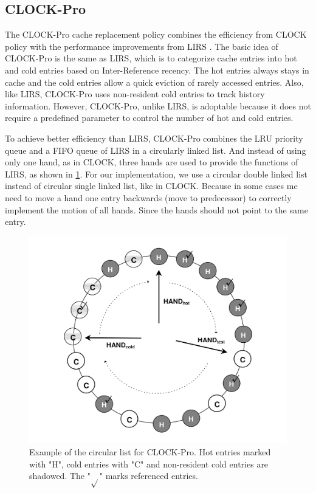 \documentclass[
	12pt,
	a4paper,
	abstract,
	bibliography=totoc,
	chapterprefix,
	headings=openright,
	numbers=endperiod,
	parskip=half,
	twoside,
]{scrreprt}
\begin{document}
\subsection{CLOCK-Pro}

The CLOCK-Pro cache replacement policy \cite{jiang2005clock} combines the efficiency from CLOCK policy with the performance improvements from LIRS 
\cite{10.1145/511399.511340}.
The basic idea of CLOCK-Pro is the same as LIRS, which is to categorize cache entries into hot and cold entries based on Inter-Reference recency.
The hot entries always stays in cache and the cold entries allow a quick eviction of rarely accessed entries.
Also, like LIRS, CLOCK-Pro uses non-resident cold entries to track history information.
However, CLOCK-Pro, unlike LIRS, is adoptable because it does not require a predefined parameter to control the number of hot and cold entries.

To achieve better efficiency than LIRS, CLOCK-Pro combines the LRU priority queue and a FIFO queue of LIRS in a circularly linked list.
And instead of using only one hand, as in CLOCK, three hands are used to provide the functions of LIRS, 
as shown in \cref{fig:clock in clock-pro}.
For our implementation, we use a circular double linked list instead of circular single linked list, like in CLOCK.
Because in some cases me need to move a hand one entry backwards (move to predecessor) to correctly implement the motion of all hands.
Since the hands should not point to the same entry.

\begin{figure}[ht]
	\centering
	\includegraphics[scale=0.2]{clock_pro.png}
	\caption{Example of the circular list for CLOCK-Pro. Hot entries marked with "H", cold entries with "C" and non-resident cold entries are shadowed.
	The "$\sqrt{}$" marks referenced entries.}
		\label{fig:clock in clock-pro}
\end{figure}
\end{document}
